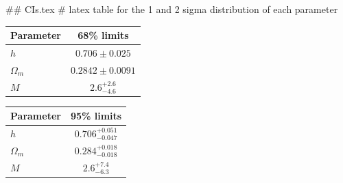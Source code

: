 ## CIs.tex
# latex table for the 1 and 2 sigma distribution of each parameter

\begin{tabular} { l  c}
 Parameter &  68\% limits\\
\hline
{\boldmath$h              $} & $0.706\pm 0.025            $\\
{\boldmath$\Omega_m       $} & $0.2842\pm 0.0091          $\\
{\boldmath$M              $} & $2.6^{+2.6}_{-4.6}         $\\
\hline
\end{tabular}

\begin{tabular} { l  c}
 Parameter &  95\% limits\\
\hline
{\boldmath$h              $} & $0.706^{+0.051}_{-0.047}   $\\
{\boldmath$\Omega_m       $} & $0.284^{+0.018}_{-0.018}   $\\
{\boldmath$M              $} & $2.6^{+7.4}_{-6.3}         $\\
\hline
\end{tabular}
